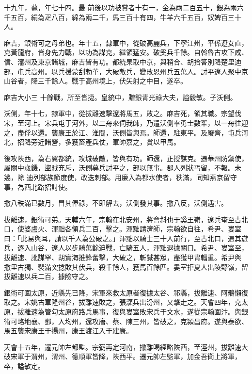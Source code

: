 \begin{pinyinscope}
 十九年，薨，年七十四。最
 前後以功被賞者十有一，金為兩二百五十，銀為兩六千五百，絹為疋八百，綿為兩二千，馬三百十有四，牛羊六千五百，奴婢百三十人。



 麻吉，銀術可之母弟也。年十五，隸軍中，從破高麗兵，下寧江州，平係遼女直，克黃龍府，皆身先力戰，以功為謀克，繼領猛安。破奚兵千餘。自斡魯古攻下咸、信、瀋州及東京諸城，麻吉皆有功。都統杲取中京，與稍合、胡拾答別降楚里迪部，屯兵高州。以兵援蒙刮勃堇，大破敵兵，變敗恩州兵五萬人。討平遼人聚中京山谷者，降三千餘人。戰于高州境上，伏矢射之中目，遂卒。



 麻吉大小三
 十餘戰，所至皆捷。皇統中，贈銀青光祿大夫，謚毅敏。子沃側。



 沃側，年十七，隸軍中，從拔離速擊遼將馬五，敗之。麻吉死，領其職。宗望伐宋，至河上。宋兵屯于河外，以二舟來伺我師，乃遣沃側率勇士數輩，以一舟往迎之，盡俘以還。襲康王於江、淮間，沃側皆與焉。師還，駐東平。及廢齊，屯兵河北，招降旁近諸營，多獲畜產兵仗，軍帥嘉之，賞以甲馬。



 後攻陜西，為右翼都統，攻城破敵，皆與有功。師還，正授謀克。遷華州防禦使，屬關中歲饑，盜賊充斥，沃側募兵討平之，部以無事。郡人列狀丐留，不報。未幾，除
 迪列部族節度使，改迭刺部。用廉入為都水使者，秩滿，同知燕京留守事，為西北路招討使。



 撒八秩滿已數月，冒其俸祿，不即解去，沃側發其事。撒八反，沃側遇害。



 拔離速，銀術可弟。天輔六年，宗翰在北安州，將會斜也于奚王嶺，遼兵奄至古北口，使婆盧火、渾黜各領兵二百，擊之。渾黜請濟師，宗翰欲自往，希尹、婁室曰：「此易與耳，請以千人為公破之。」渾黜以騎士三十人前行，至古北口，遇其遊兵，逐入山谷，遼人以步騎萬餘迫戰，亡騎五人，渾黜退據關口。希尹、婁室至，拔離速、訛謀罕、胡實海推鋒奮擊，大破之，斬馘甚眾，盡獲甲胄輜重。希尹與
 撒里古獨、裴滿突捻敗其伏兵，殺千餘人，獲馬百餘匹。婁室拒夏人出陵野嶺，留拔離速以兵二百，據險守之。



 銀術可圍太原，近縣先已降，宋軍來救太原者復據太谷、祁縣，拔離速、阿鶻懶復取之。宋姚古軍隆州谷，拔離速敗之，張灝兵出汾州，又擊走之。天會四年，克太原，拔離速為管勾太原府路兵馬事，復與婁室敗宋兵于文水，遂從宗翰圍汴。與銀術可略地襄、鄧，入均州，還攻唐、蔡、陳三州，皆破之，克潁昌府。遂與泰欲、馬五襲宋康王于揚州，康王渡江入于建康。



 天會十五年，遷元帥左都監。宗弼再定河南，撒離喝經略陜西，至涇州，拔離速大
 破宋軍于渭州，渭州、德順軍皆降，陜西平。遷元帥左監軍，加金吾衛上將軍，卒，謚敏定。




\end{pinyinscope}
